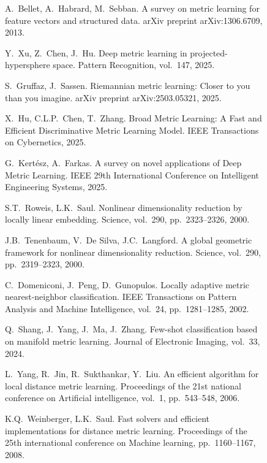 \documentclass[review]{elsarticle}
\begin{document}
\begin{figure}[htbp]
\begin{thebibliography}{50}
A.~Bellet, A.~Habrard, M.~Sebban.
\newblock A survey on metric learning for feature vectors and structured data.
\newblock arXiv preprint arXiv:1306.6709, 2013.

Y.~Xu, Z.~Chen, J.~Hu.
\newblock Deep metric learning in projected-hypersphere space.
\newblock Pattern Recognition, vol.~147, 2025.

S.~Gruffaz, J.~Sassen.
\newblock Riemannian metric learning: Closer to you than you imagine.
\newblock arXiv preprint arXiv:2503.05321, 2025.

X.~Hu, C.L.P.~Chen, T.~Zhang.
\newblock Broad Metric Learning: A Fast and Efficient Discriminative Metric Learning Model.
\newblock IEEE Transactions on Cybernetics, 2025.

G.~Kert\'{e}sz, A.~Farkas.
\newblock A survey on novel applications of Deep Metric Learning.
 IEEE 29th International Conference on Intelligent Engineering Systems, 2025.

S.T.~Roweis, L.K.~Saul.
\newblock Nonlinear dimensionality reduction by locally linear embedding.
\newblock Science, vol.~290, pp.~2323--2326, 2000.

J.B.~Tenenbaum, V.~De Silva, J.C.~Langford.
\newblock A global geometric framework for nonlinear dimensionality reduction.
\newblock Science, vol.~290, pp.~2319--2323, 2000.

C.~Domeniconi, J.~Peng, D.~Gunopulos.
\newblock Locally adaptive metric nearest-neighbor classification.
\newblock IEEE Transactions on Pattern Analysis and Machine Intelligence, vol.~24, pp.~1281--1285, 2002.

Q.~Shang, J.~Yang, J.~Ma, J.~Zhang.
\newblock Few-shot classification based on manifold metric learning.
\newblock Journal of Electronic Imaging, vol.~33, 2024.

L.~Yang, R.~Jin, R.~Sukthankar, Y.~Liu.
\newblock An efficient algorithm for local distance metric learning.
\newblock Proceedings of the 21st national conference on Artificial intelligence, vol.~1, pp.~543--548, 2006.

K.Q.~Weinberger, L.K.~Saul.
\newblock Fast solvers and efficient implementations for distance metric learning.
\newblock Proceedings of the 25th international conference on Machine learning, pp.~1160--1167, 2008.


\end{thebibliography}
\end{figure}
\end{document}
